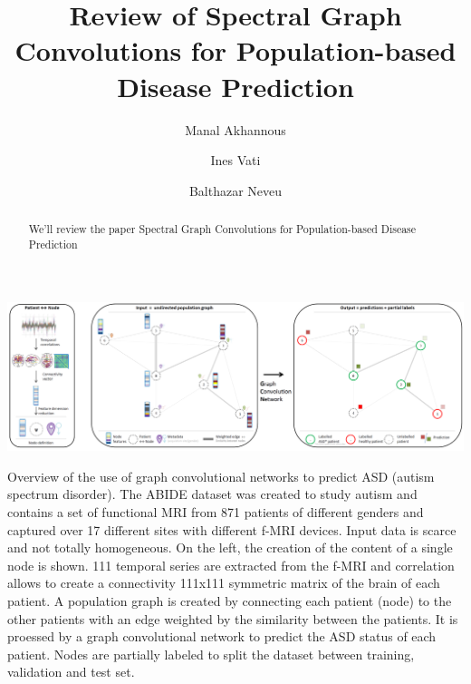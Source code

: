 \documentclass[sigconf]{acmart}
\begin{document}
\title{Review of Spectral Graph Convolutions for Population-based Disease Prediction}

\author{Manal Akhannous}

\author{Ines Vati}

\author{Balthazar Neveu}


\renewcommand{\shortauthors}{Akhannous, Vati, Neveu}

\begin{abstract}
  We'll review the paper Spectral Graph Convolutions for Population-based Disease Prediction \cite{Parisot17}

\end{abstract}

\begin{teaserfigure}
  \includegraphics[width=\textwidth]{figures/spectral_graph_convolution_graph_overview.png}
  \caption{Overview of the use of graph convolutional networks to predict ASD (autism spectrum disorder).
  The ABIDE dataset was created to study autism and contains a set of functional MRI from 871 patients 
  of different genders and captured over 17 different sites with different f-MRI devices. Input data is scarce and not totally homogeneous.
  On the left, the creation of the content of a single node is shown. 111 temporal series are extracted from the f-MRI 
  and correlation allows to create a connectivity 111x111 symmetric matrix of the brain of each patient.
  A population graph is created by connecting each patient (node) to the other patients with an edge weighted by the similarity between the patients.
  It is proessed by a graph convolutional network to predict the ASD status of each patient.
  Nodes are partially labeled to split the dataset between training, validation and test set.
  }
  \Description{}
  \label{fig:overview}
\end{teaserfigure}
\end{document}
